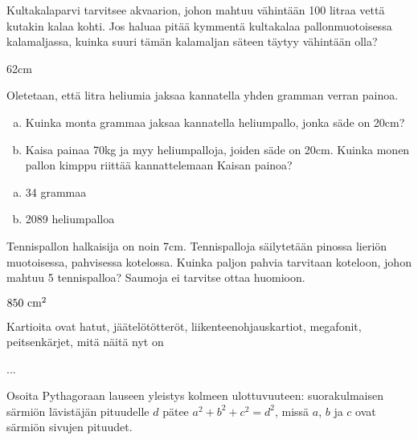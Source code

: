 \begin{tehtavasivu}

\begin{tehtava}
Kultakalaparvi tarvitsee akvaarion, johon mahtuu vähintään 100 litraa vettä kutakin kalaa kohti. Jos haluaa pitää kymmentä kultakalaa pallonmuotoisessa kalamaljassa, kuinka suuri tämän kalamaljan säteen täytyy vähintään olla?
\begin{vastaus}
62cm
\end{vastaus}
\end{tehtava}

\begin{tehtava}
Oletetaan, että litra heliumia jaksaa kannatella yhden gramman verran painoa.
\begin{enumerate}[a)]
\item Kuinka monta grammaa jaksaa kannatella heliumpallo, jonka säde on 20cm?
\item Kaisa painaa 70kg ja myy heliumpalloja, joiden säde on 20cm. Kuinka monen pallon kimppu riittää kannattelemaan Kaisan painoa?
\end{enumerate}
\begin{vastaus}
\begin{enumerate}[a)]
\item 34 grammaa
\item 2089 heliumpalloa
\end{enumerate}
\end{vastaus}
\end{tehtava}

\begin{tehtava}
Tennispallon halkaisija on noin 7cm. Tennispalloja säilytetään pinossa lieriön muotoisessa, pahvisessa kotelossa. Kuinka paljon pahvia tarvitaan koteloon, johon mahtuu 5 tennispalloa? Saumoja ei tarvitse ottaa huomioon.
\begin{vastaus}
$850~\textnormal{cm}^2$
\end{vastaus}
\end{tehtava}

\begin{tehtava}
Kartioita ovat hatut, jäätelötötteröt, liikenteenohjauskartiot, megafonit, peitsenkärjet, mitä näitä nyt on
\begin{vastaus}
...
\end{vastaus}
\end{tehtava}

\begin{tehtava}
Osoita Pythagoraan lauseen yleistys kolmeen ulottuvuuteen: suorakulmaisen särmiön lävistäjän pituudelle $d$ pätee
$a^2+b^2+c^2=d^2$, missä $a$, $b$ ja $c$ ovat särmiön sivujen pituudet.
\end{tehtava}

\end{tehtavasivu}
